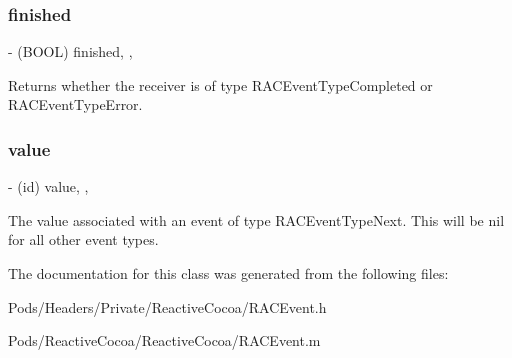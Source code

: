\subsubsection{\texorpdfstring{finished}{finished}}
{\footnotesize\ttfamily -\/ (B\+O\+OL) finished\hspace{0.3cm}{\ttfamily [read]}, {\ttfamily [nonatomic]}, {\ttfamily [assign]}}

Returns whether the receiver is of type R\+A\+C\+Event\+Type\+Completed or R\+A\+C\+Event\+Type\+Error. \mbox{\label{interface_r_a_c_event_a82805c6e95ad056979f593a90addb86a}} 
\subsubsection{\texorpdfstring{value}{value}}
{\footnotesize\ttfamily -\/ (id) value\hspace{0.3cm}{\ttfamily [read]}, {\ttfamily [nonatomic]}, {\ttfamily [strong]}}

The value associated with an event of type R\+A\+C\+Event\+Type\+Next. This will be nil for all other event types. 

The documentation for this class was generated from the following files\+:\begin{DoxyCompactItemize}
\item 
Pods/\+Headers/\+Private/\+Reactive\+Cocoa/R\+A\+C\+Event.\+h\item 
Pods/\+Reactive\+Cocoa/\+Reactive\+Cocoa/R\+A\+C\+Event.\+m\end{DoxyCompactItemize}
